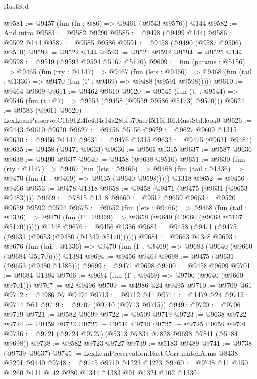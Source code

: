 \begin{lexlean}{RustStd}
\begin{coremodule}
@9581 := @9457 (fun (fn : @86) => @9461 (@9543 @9576)) @144
@9582 := And.intro
@9583 := @9582 @9290
@9585 := @9498 (@9499 @144)
@9586 := @9502 @144
@9587 := @9585 @9586
@9591 := @9458 (@9490 (@9587 @9506) @9510)
@9592 := @9522 @144
@9593 := @9521 @9592
@9594 := @9525 @144
@9598 := @9519 (@9593 @9594 @5167 @5170)
@9609 := fun (params : @5156) =>
  @9465
    (fun (rty : @1147) =>
    @9467
      (fun (lets : @9466) =>
      @9468 (fun (tail : @1336) => @9470 (fun (Γ : @9469) => @9488 (@9591 @9598)))))
@9610 := @9464 @9609
@9611 := @9462 @9610
@9620 := @9545 (fun (U : @9544) => @9546 (fun (t : @7) => @9553 (@9458 (@9559 @9586 @5173) @9570)))
@9624 := @9583 (@9611 @9620) LexLeanPreserve.C1b912f4fc4d4e14a28bfb70aeef5f16f.R6.RustStd.look0
@9626 := @9443 @9610 @9620
@9627 := @9456 @5156
@9629 := @9627 @9609 @1315
@9630 := @9456 @1147
@9631 := @9476 @1315
@9633 := @9475 (@9631 @9484)
@9635 := @9458 (@9471 @9633)
@9636 := @9505 @1315
@9637 := @9587 @9636
@9638 := @9490 @9637
@9640 := @9458 (@9638 @9510)
@9651 := @9630
    (fun (rty : @1147) =>
    @9467
      (fun (lets : @9466) =>
      @9468 (fun (tail : @1336) => @9470 (fun (Γ : @9469) => @9635 (@9640 @9598)))))
    @1318
@9652 := @9456 @9466
@9653 := @9478 @1318
@9658 := @9458 (@9471 (@9475 (@9631 (@9653 @9483))))
@9659 := @7815 @1318
@9660 := @9517 @9659
@9663 := @9520 @9659 @9592 @9594
@9675 := @9652
    (fun (lets : @9466) =>
    @9468
      (fun (tail : @1336) => @9470 (fun (Γ : @9469) => @9658 (@9640 (@9660 (@9663 @5167 @5170))))))
    @1348
@9676 := @9456 @1336
@9683 := @9458 (@9471 (@9475 (@9631 (@9653 (@9480 (@1349 @5170))))))
@9684 := @9663 @1348
@9693 := @9676
    (fun (tail : @1336) => @9470 (fun (Γ : @9469) => @9683 (@9640 (@9660 (@9684 @5170)))))
    @1384
@9694 := @9456 @9469
@9698 := @9475 (@9631 (@9653 (@9480 @1385)))
@9699 := @9471 @9698
@9700 := @9458 @9699
@9701 := @9684 @1384
@9706 := @9694 (fun (Γ : @9469) => @9700 (@9640 (@9660 @9701)))
@9707 := @2 @9496
@9709 := @4986 @24 @9495
@9710 := @9709 @61
@9712 := @4986 @7 @9494
@9713 := @9712 @11
@9714 := @1479 @24
@9715 := @9714 @61
@9719 := @9707 (@9710 (@9713 @9715)) @9497
@9720 := @9706 @9719
@9721 := @9582 @9699
@9722 := @9509 @9719
@9723 := @9638 @9722
@9724 := @9458 @9723
@9725 := @9516 @9719
@9727 := @9725 @9659 @9701
@9736 := @9721 (@9724 @9727) (@5313 @7834 @7828 @9698 @7841 (@5184 @9698))
@9738 := @9582 @9723 @9727
@9739 := @5183 @9489
@9741 := @9738 (@9739 @9637)
@9745 := LexLeanPreservation.Rust.Corr.matchArms @8438 @5291 @9440
@9748 := @9745 @9719 @1223 @1223
@9760 := @9748 @11 @150 @1260 @111 @142 @280 @1344 @1383 @91 @1324 @102 @1330

\end{coremodule}
\end{lexlean}
